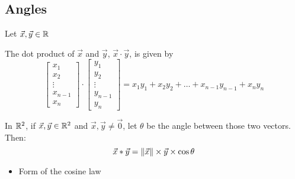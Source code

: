 \documentclass{mlatext}
\begin{document}
\subsection{Angles}
\begin{defn}

  Let $\vec{x}, \vec{y} \in \mathbb{R}$
  
  The dot product of $\vec{x}$ and $\vec{y}$, $\vec{x} \cdot \vec{y}$, is given by
  \begin{equation*}
    \begin{bmatrix} x_1\\x_2\\\vdots\\x_{n-1}\\x_n\end{bmatrix} \cdot \begin{bmatrix}y_1\\y_2\\\vdots\\y_{n-1}\\y_n\end{bmatrix} = x_1y_1 + x_2y_2 + \ldots + x_{n-1}y_{n-1} + x_ny_n
  \end{equation*}
\end{defn}

\begin{thm}

  In $\mathbb{R}^2$, if $\vec{x}, \vec{y} \in \mathbb{R}^2$ and $\vec{x}, \vec{y} \neq \vec{0}$, let $\theta$ be the angle between those two vectors. Then:
  \begin{equation*}
    \vec{x} * \vec{y} = \lVert \vec{x} \rVert \times \vec{y} \times \cos{\theta}
  \end{equation*}
\end{thm}
\begin{itemize}
\item Form of the cosine law
\end{itemize}
\end{document}
